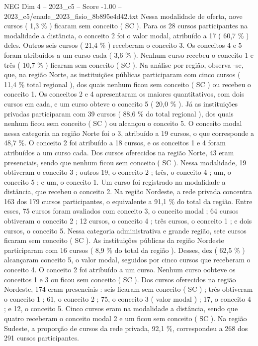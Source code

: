 \begin{textsample}{NEG Dim 4 – 2023\_c5 – Score -1.00 – 2023\_c5/enade\_2023\_fisio\_8b895e4d42.txt}
Nessa modalidade de oferta, nove cursos ( 1,3 \% ) ficaram sem conceito ( SC ).
Para os 28 cursos participantes na modalidade a distância, o conceito 2 foi o valor modal, atribuído a 17 ( 60,7 \% ) deles.
Outros seis cursos ( 21,4 \% ) receberam o conceito 3.
Os conceitos 4 e 5 foram atribuídos a um curso cada ( 3,6 \% ).
Nenhum curso recebeu o conceito 1 e três ( 10,7 \% ) ficaram sem conceito ( SC ).
Na análise por região, observa -se, que, na região Norte, as instituições públicas participaram com cinco cursos ( 11,4 \% total regional ), dos quais nenhum ficou sem conceito ( SC ) ou recebeu o conceito 1.
Os conceitos 2 e 4 apresentaram os maiores quantitativos, com dois cursos em cada, e um curso obteve o conceito 5 ( 20,0 \% ).
Já as instituições privadas participaram com 39 cursos ( 88,6 \% do total regional ), dos quais nenhum ficou sem conceito ( SC ) ou alcançou o conceito 5.
O conceito modal nessa categoria na região Norte foi o 3, atribuído a 19 cursos, o que corresponde a 48,7 \%.
O conceito 2 foi atribuído a 18 cursos, e os conceitos 1 e 4 foram atribuídos a um curso cada.
Dos cursos oferecidos na região Norte, 43 eram presenciais, sendo que nenhum ficou sem conceito ( SC ).
Nessa modalidade, 19 obtiveram o conceito 3 ; outros 19, o conceito 2 ; três, o conceito 4 ; um, o conceito 5 ; e um, o conceito 1.
Um curso foi registrado na modalidade a distância, que recebeu o conceito 2.
Na região Nordeste, a rede privada concentra 163 dos 179 cursos participantes, o equivalente a 91,1 \% do total da região.
Entre esses, 75 cursos foram avaliados com conceito 3, o conceito modal ; 64 cursos obtiveram o conceito 2 ; 12 cursos, o conceito 4 ; três cursos, o conceito 1 ; e dois cursos, o conceito 5.
Nessa categoria administrativa e grande região, sete cursos ficaram sem conceito ( SC ).
As instituições públicas da região Nordeste participaram com 16 cursos ( 8,9 \% do total da região ).
Desses, dez ( 62,5 \% ) alcançaram conceito 5, o valor modal, seguidos por cinco cursos que receberam o conceito 4.
O conceito 2 foi atribuído a um curso.
Nenhum curso oobteve os conceitos 1 e 3 ou ficou sem conceito ( SC ).
Dos cursos oferecidos na região Nordeste, 174 eram presenciais : seis ficaram sem conceito ( SC ) ; três obtiveram o conceito 1 ; 61, o conceito 2 ; 75, o conceito 3 ( valor modal ) ; 17, o conceito 4 ; e 12, o conceito 5.
Cinco cursos eram na modalidade a distância, sendo que quatro receberam o conceito modal 2 e um ficou sem conceito ( SC ).
Na região Sudeste, a proporção de cursos da rede privada, 92,1 \%, correspondeu a 268 dos 291 cursos participantes.

\end{textsample}
